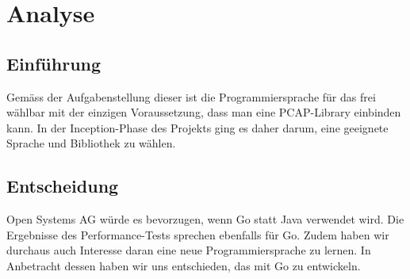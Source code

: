 \chapter{Analyse}
\label{chap:Analyse}

\section{Einführung}
Gemäss der Aufgabenstellung dieser \work{} ist die Programmiersprache für das \tool{} frei wählbar mit der einzigen Voraussetzung, dass man eine \acs{PCAP}-Library einbinden kann. In der Inception-Phase des Projekts ging es daher darum, eine geeignete Sprache und Bibliothek zu wählen.









\section{Entscheidung}
Open Systems AG würde es bevorzugen, wenn Go statt Java verwendet wird. Die Ergebnisse des Performance-Tests sprechen ebenfalls für Go. Zudem haben wir durchaus auch Interesse daran eine neue Programmiersprache zu lernen.
In Anbetracht dessen haben wir uns entschieden, das \tool{} mit Go zu entwickeln.





